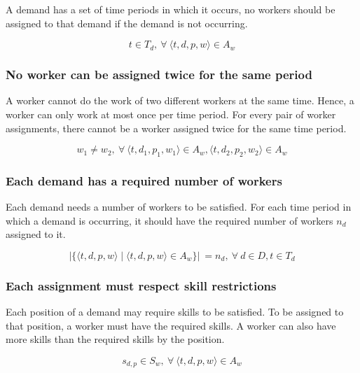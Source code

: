 \documentclass[../thesis.tex]{subfiles}
\begin{document}
A demand has a set of time periods in which it occurs,
no workers should be assigned to that demand if the demand is not 
occurring. 

\begin{equation*}
  t \in T_d, \ \forall \ \langle t, d, p, w\rangle \in A_w
\end{equation*}

\subsubsection{No worker can be assigned twice for the same period} 

A worker cannot do the work of two different workers at the same time.
Hence, a worker can only work at most once per time period.
For every pair of worker assignments, there cannot be a worker assigned twice for the same time period.

\begin{equation*}
  w_1 \neq w_2, \ \forall \ \langle t, d_1, p_1, w_1\rangle \in A_w,  \langle t, d_2, p_2, w_2\rangle \in A_w
\end{equation*}

\subsubsection{Each demand has a required number of workers}

Each demand needs a number of workers to be satisfied. 
For each time period in which a demand is occurring, it should have the required 
number of workers $n_d$ assigned to it.

\begin{equation*}
  |\{ \langle t, d, p, w\rangle \mid \langle t, d, p, w\rangle \in A_w \}| \ = n_d, \ \forall \ d \in D, t \in T_d
\end{equation*}



\subsubsection{Each assignment must respect skill restrictions}

Each position of a demand may require skills to be satisfied. 
To be assigned to that position, a worker must have the required skills. 
A worker can also have more skills than the required skills by the position.

\begin{equation*}
  s_{d,p} \in S_w, \ \forall \ \langle t, d, p, w\rangle \in A_w
\end{equation*}
\end{document}
